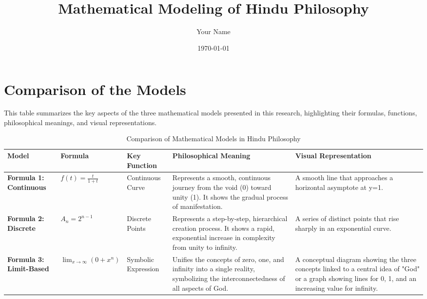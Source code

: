 \documentclass{article}
\title{Mathematical Modeling of Hindu Philosophy}
\author{Your Name} %
\date{\today}
\begin{document}
\maketitle

\section*{Comparison of the Models}

This table summarizes the key aspects of the three mathematical models presented in this research, highlighting their formulas, functions, philosophical meanings, and visual representations.

\begin{table}[h!]
    \centering
    \caption{Comparison of Mathematical Models in Hindu Philosophy}
    \label{tab:model_comparison}
    \begin{tabular}{lp{2.2cm}p{2.8cm}p{4cm}p{4cm}} 
        \toprule
        \textbf{Model} & \textbf{Formula} & \textbf{Key Function} & \textbf{Philosophical Meaning} & \textbf{Visual Representation} \\
        \midrule
        \textbf{Formula 1: Continuous} & $f(t)=\frac{t}{1+t}$ & Continuous Curve & Represents a smooth, continuous journey from the void (0) toward unity (1). It shows the gradual process of manifestation. & A smooth line that approaches a horizontal asymptote at y=1. \\
        \midrule
        \textbf{Formula 2: Discrete} & $A_{n}=2^{n-1}$ & Discrete Points & Represents a step-by-step, hierarchical creation process. It shows a rapid, exponential increase in complexity from unity to infinity. & A series of distinct points that rise sharply in an exponential curve. \\
        \midrule
        \textbf{Formula 3: Limit-Based} & $\lim_{x\rightarrow\infty}(0+x^{n})$ & Symbolic Expression & Unifies the concepts of zero, one, and infinity into a single reality, symbolizing the interconnectedness of all aspects of God. & A conceptual diagram showing the three concepts linked to a central idea of "God" or a graph showing lines for 0, 1, and an increasing value for infinity. \\
        \bottomrule
    \end{tabular}
\end{table}
\end{document}
